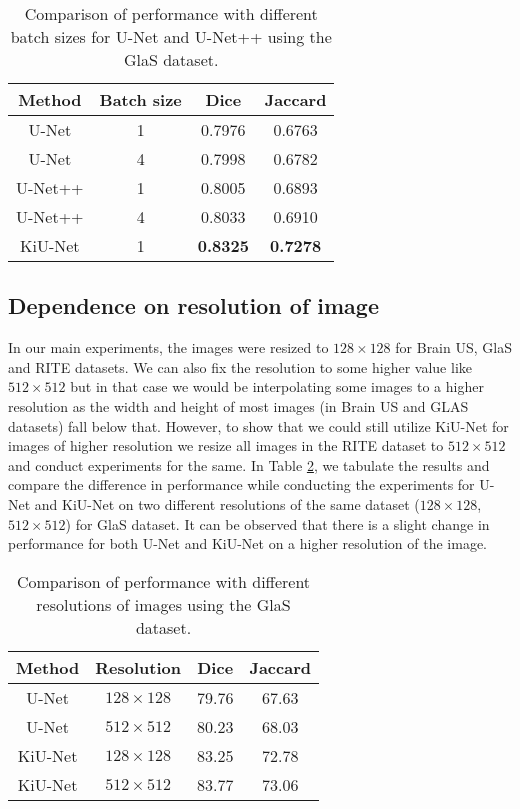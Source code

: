 \documentclass[journal,twoside,web]{ieeecolor}
\begin{document}
\begin{table}[htbp]
	\centering
	\caption{Comparison of performance with different batch sizes for U-Net and U-Net++ using the GlaS dataset.}
	\begin{tabular}{c|c|c|c}
		\hline
		Method    & Batch size & Dice & Jaccard \\ \hline
		U-Net   & 1    & 0.7976 & 0.6763 \\ 
		U-Net & 4    & 0.7998 & 0.6782 \\ \hline
		U-Net++ & 1    & 0.8005 & 0.6893 \\ 
		U-Net++ & 4    & 0.8033 & 0.6910 \\ \hline
		KiU-Net   & 1         & \textbf{0.8325}      & \textbf{0.7278}    
	\end{tabular}
	
	\label{r1q6}
\end{table}

\subsection{Dependence on resolution of image}

In our main experiments, the images were resized to $128 \times 128$ for Brain US, GlaS and RITE datasets. We can also fix the resolution to some higher value like $512 \times 512$ but in that case we would be interpolating some images to a higher resolution as the width and height of most images (in Brain US and GLAS datasets) fall below that. However, to show that we could still utilize KiU-Net for images of higher resolution we resize all images in the RITE dataset to $512 \times 512$ and conduct experiments for the same. In Table \ref{r1q8}, we tabulate the results and compare the difference in performance while conducting the experiments for U-Net and KiU-Net on two different resolutions of the same dataset ($128 \times 128$, $512 \times 512$) for GlaS dataset. It can be observed that there is a slight change in performance for both U-Net and KiU-Net on a higher resolution of the image.

\begin{table}[htbp]
	\centering
	\caption{Comparison of performance with different resolutions of images using the GlaS dataset.}
	\begin{tabular}{c|c|c|c}
		\hline
		Method    & Resolution & Dice & Jaccard \\ \hline
		U-Net   & $128 \times 128$    &79.76  &67.63  \\ 
		U-Net & $512 \times 512$    &80.23  &68.03  \\ \hline
		KiU-Net & $128 \times 128$    &83.25  &72.78 \\ 
		KiU-Net   & $512 \times 512$         & 83.77     & 73.06     
	\end{tabular}
	
	\label{r1q8}
\end{table}
\end{document}
